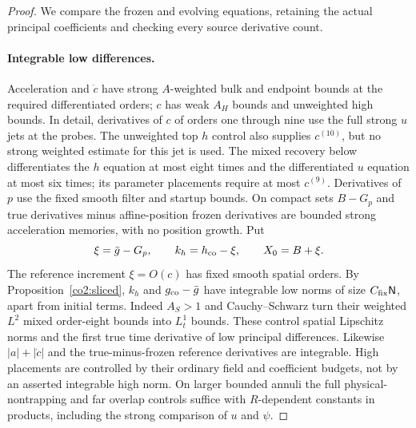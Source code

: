 \begin{proof}
We compare the frozen and evolving equations, retaining the actual
principal coefficients and checking every source derivative count.

\paragraph{Integrable low differences.}
Acceleration and $\dot c$ have strong $A$-weighted bulk and endpoint bounds
at the required differentiated orders; $c$ has weak $A_H$ bounds and
unweighted high bounds.  In detail, derivatives of $c$ of orders one through
nine use the full strong $u$ jets at the probes.  The unweighted top $h$
control also supplies $c^{(10)}$, but no strong weighted estimate for this
jet is used.  The mixed recovery below differentiates the $h$ equation at
most eight times and the differentiated $u$ equation at most six times;
its parameter placements require at most $c^{(9)}$.  Derivatives of $p$ use
the fixed smooth filter and startup bounds.  On compact sets $B-G_p$ and true derivatives
minus affine-position frozen derivatives are bounded strong acceleration
memories, with no position growth.  Put
\begin{equation}\label{co2:recentered-fields}
 \xi=\bar g-G_p,\qquad k_h=h_{\rm co}-\xi,\qquad X_0=B+\xi.
\end{equation}
The reference increment $\xi=O(c)$ has fixed smooth spatial orders.
By Proposition~\ref{co2:sliced}, $k_h$ and $g_{\rm co}-\bar g$ have
integrable low norms of size $C_{\rm fix}\mathsf N$, apart from initial
terms.  Indeed $A_S>1$ and Cauchy--Schwarz turn their weighted $L^2$ mixed
order-eight bounds into $L^1_t$ bounds.  These control spatial Lipschitz norms
and the first true time derivative of low principal differences.  Likewise
$|a|+|\dot c|$ and the true-minus-frozen reference derivatives are integrable.
High placements are controlled by their ordinary field and coefficient
budgets, not by an asserted integrable high norm.  On larger bounded annuli
the full physical-nontrapping and far overlap controls suffice with
$R$-dependent constants in products, including the strong comparison of $u$
and $\psi$.


\end{proof}

